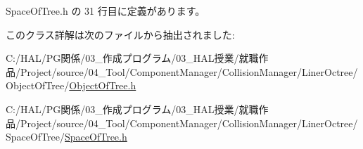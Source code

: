  Space\+Of\+Tree.\+h の 31 行目に定義があります。



このクラス詳解は次のファイルから抽出されました\+:\begin{DoxyCompactItemize}
\item 
C\+:/\+H\+A\+L/\+P\+G関係/03\+\_\+作成プログラム/03\+\_\+\+H\+A\+L授業/就職作品/\+Project/source/04\+\_\+\+Tool/\+Component\+Manager/\+Collision\+Manager/\+Liner\+Octree/\+Object\+Of\+Tree/\mbox{\hyperlink{_object_of_tree_8h}{Object\+Of\+Tree.\+h}}\item 
C\+:/\+H\+A\+L/\+P\+G関係/03\+\_\+作成プログラム/03\+\_\+\+H\+A\+L授業/就職作品/\+Project/source/04\+\_\+\+Tool/\+Component\+Manager/\+Collision\+Manager/\+Liner\+Octree/\+Space\+Of\+Tree/\mbox{\hyperlink{_space_of_tree_8h}{Space\+Of\+Tree.\+h}}\end{DoxyCompactItemize}
